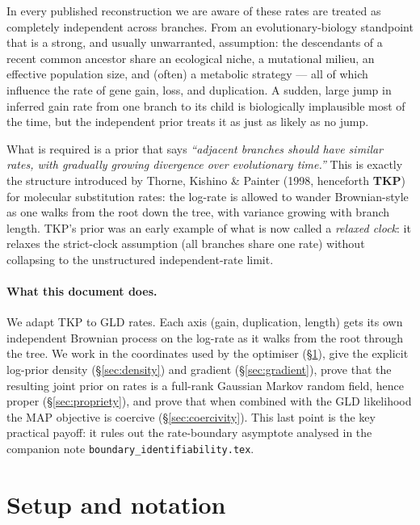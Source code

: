 \documentclass[11pt]{article}
\theoremstyle{definition}
\begin{document}
In every published reconstruction we are aware of these rates are
treated as completely independent across branches. From an
evolutionary-biology standpoint that is a strong, and usually
unwarranted, assumption: the descendants of a recent common ancestor
share an ecological niche, a mutational milieu, an effective population
size, and (often) a metabolic strategy --- all of which influence the
rate of gene gain, loss, and duplication. A sudden, large jump in
inferred gain rate from one branch to its child is biologically
implausible most of the time, but the independent prior treats it as
just as likely as no jump.

What is required is a prior that says \emph{``adjacent branches should
have similar rates, with gradually growing divergence over evolutionary
time.''} This is exactly the structure introduced by Thorne, Kishino
\& Painter (1998, henceforth \textbf{TKP}) for molecular substitution
rates: the log-rate is allowed to wander Brownian-style as one walks
from the root down the tree, with variance growing with branch length.
TKP's prior was an early example of what is now called a
\emph{relaxed clock}: it relaxes the strict-clock assumption (all
branches share one rate) without collapsing to the unstructured
independent-rate limit.

\paragraph{What this document does.} We adapt TKP to GLD rates.
Each axis (gain, duplication, length) gets its own independent
Brownian process on the log-rate as it walks from the root through
the tree. We work in the coordinates used by the optimiser
(\S\ref{sec:setup}), give the explicit log-prior density
(\S\ref{sec:density}) and gradient (\S\ref{sec:gradient}), prove that
the resulting joint prior on rates is a full-rank Gaussian Markov
random field, hence proper (\S\ref{sec:propriety}), and prove that
when combined with the GLD likelihood the MAP objective is coercive
(\S\ref{sec:coercivity}). This last point is the key practical payoff:
it rules out the rate-boundary asymptote analysed in the companion
note \texttt{boundary\_identifiability.tex}.

\section{Setup and notation}
\label{sec:setup}
\end{document}
